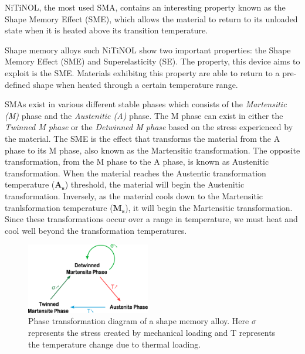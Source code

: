 NiTiNOL, the most used SMA, contains an interesting property known as the Shape Memory Effect (SME), which allows the material to return to its unloaded state when it is heated above its transition temperature.

Shape memory alloys such NiTiNOL show two important properties: the Shape Memory Effect (SME) and Superelasticity (SE)\cite{rao_design_2015}. The property, this device aims to exploit is the SME. Materials exhibitng this property are able to return to a pre-defined shape when heated through a certain temperature range.

SMAs exist in various different stable phases which consists of the \emph{Martensitic (M)} phase and the \emph{Austenitic (A)} phase. The M phase can exist in either the \emph{Twinned M phase} or the \emph{Detwinned M phase} based on the stress experienced by the material. The SME is the effect that transforms the material from the A phase to its M phase, also known as the Martensitic transformation. The opposite transformation, from the M phase to the A phase, is known as Austenitic transformation. When the material reaches the Austentic transformation temperature ($\mathbf{A_s}$) threshold, the material will begin the Austenitic transformation. Inversely, as the material cools down to the Martensitic tranlsformation temperature ($\mathbf{M_s}$), it will begin the Martensitic transformation. Since these transformations occur over a range in temperature, we must heat and cool well beyond the transformation temperatures.

\begin{figure}
  \centering
  \includegraphics[width=0.48\textwidth]{Figures/Phase_Transf_Diagram_noText.eps}
  \caption{Phase transformation diagram of a shape memory alloy. Here $\sigma$ represents the stress created by mechanical loading and T represents the temperature change due to thermal loading.}
	\vspace{-10pt}
  \label{fig:PhaseTransfDiagram}
\end{figure}


